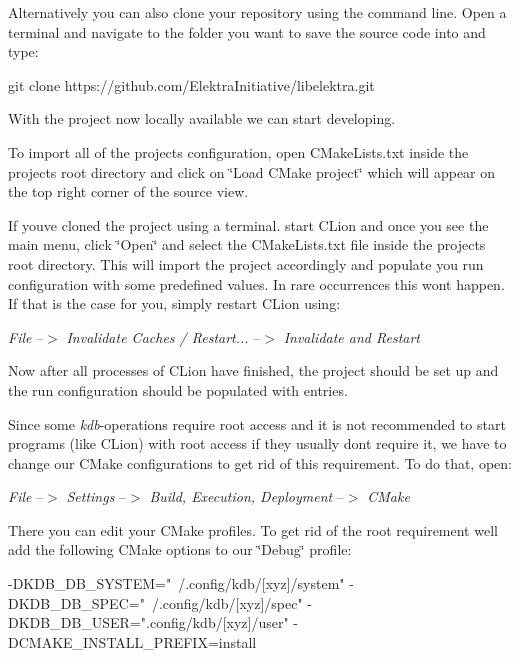 Alternatively you can also clone your repository using the command line. Open a terminal and navigate to the folder you want to save the source code into and type\+:


\begin{DoxyCode}
git clone https://github.com/ElektraInitiative/libelektra.git
\end{DoxyCode}


With the project now locally available we can start developing.

To import all of the project\textquotesingle{}s configuration, open C\+Make\+Lists.\+txt inside the project\textquotesingle{}s root directory and click on \char`\"{}\+Load C\+Make project\char`\"{} which will appear on the top right corner of the source view.

If you\textquotesingle{}ve cloned the project using a terminal. start C\+Lion and once you see the main menu, click \char`\"{}\+Open\char`\"{} and select the C\+Make\+Lists.\+txt file inside the project\textquotesingle{}s root directory. This will import the project accordingly and populate you run configuration with some predefined values. In rare occurrences this won\textquotesingle{}t happen. If that is the case for you, simply restart C\+Lion using\+:

{\itshape File} --$>$ {\itshape Invalidate Caches / Restart...} --$>$ {\itshape Invalidate and Restart}

Now after all processes of C\+Lion have finished, the project should be set up and the run configuration should be populated with entries.

Since some {\itshape kdb}-\/operations require root access and it is not recommended to start programs (like C\+Lion) with root access if they usually don\textquotesingle{}t require it, we have to change our C\+Make configurations to get rid of this requirement. To do that, open\+:

{\itshape File} --$>$ {\itshape Settings} --$>$ {\itshape Build, Execution, Deployment} --$>$ {\itshape C\+Make}

There you can edit your C\+Make profiles. To get rid of the root requirement we\textquotesingle{}ll add the following C\+Make options to our \char`\"{}\+Debug\char`\"{} profile\+:


\begin{DoxyCode}
-DKDB\_DB\_SYSTEM="~/.config/kdb/[xyz]/system"
-DKDB\_DB\_SPEC="~/.config/kdb/[xyz]/spec"
-DKDB\_DB\_USER=".config/kdb/[xyz]/user"
-DCMAKE\_INSTALL\_PREFIX=install
\end{DoxyCode}


